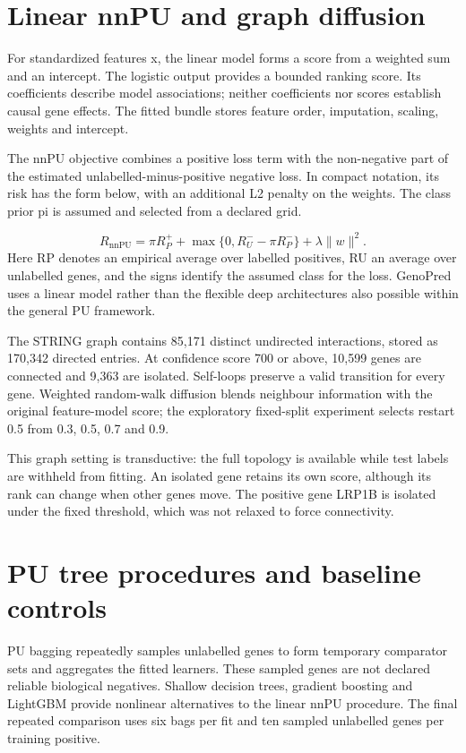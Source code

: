 \documentclass[12pt,a4paper,oneside]{report}
\begin{document}
\section{Linear nnPU and graph diffusion}
For standardized features x, the linear model forms a score from a weighted sum and an intercept. The logistic output provides a bounded ranking score. Its coefficients describe model associations; neither coefficients nor scores establish causal gene effects. The fitted bundle stores feature order, imputation, scaling, weights and intercept.

The nnPU objective combines a positive loss term with the non-negative part of the estimated unlabelled-minus-positive negative loss. In compact notation, its risk has the form below, with an additional L2 penalty on the weights. The class prior pi is assumed and selected from a declared grid.~\cite{ref10}

\begin{equation}R_{\mathrm{nnPU}}=\pi R_P^{+}+\max\{0,R_U^{-}-\pi R_P^{-}\}+\lambda\lVert w\rVert^2.\end{equation}
Here RP denotes an empirical average over labelled positives, RU an average over unlabelled genes, and the signs identify the assumed class for the loss. GenoPred uses a linear model rather than the flexible deep architectures also possible within the general PU framework.

The STRING graph contains 85,171 distinct undirected interactions, stored as 170,342 directed entries. At confidence score 700 or above, 10,599 genes are connected and 9,363 are isolated. Self-loops preserve a valid transition for every gene. Weighted random-walk diffusion blends neighbour information with the original feature-model score; the exploratory fixed-split experiment selects restart 0.5 from 0.3, 0.5, 0.7 and 0.9.

This graph setting is transductive: the full topology is available while test labels are withheld from fitting. An isolated gene retains its own score, although its rank can change when other genes move. The positive gene LRP1B is isolated under the fixed threshold, which was not relaxed to force connectivity.

\section{PU tree procedures and baseline controls}
PU bagging repeatedly samples unlabelled genes to form temporary comparator sets and aggregates the fitted learners. These sampled genes are not declared reliable biological negatives. Shallow decision trees, gradient boosting and LightGBM provide nonlinear alternatives to the linear nnPU procedure. The final repeated comparison uses six bags per fit and ten sampled unlabelled genes per training positive.
\end{document}
